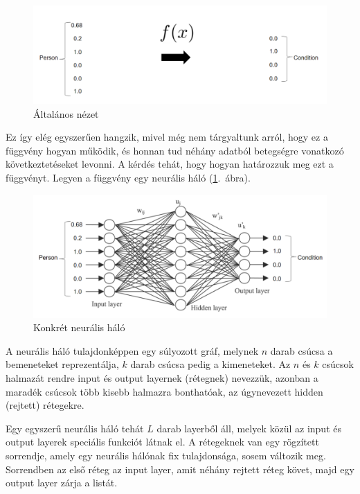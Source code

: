 \begin{figure}[h!]
  
	\begin{center}
	\includegraphics[width=\linewidth]{fgv.png}
	\end{center}
  \caption{Általános nézet}
\end{figure}

Ez így elég egyszerűen hangzik, mivel még nem tárgyaltunk arról, hogy ez a függvény hogyan működik, és honnan tud néhány adatból betegségre vonatkozó következtetéseket levonni. A kérdés tehát, hogy hogyan határozzuk meg ezt a függvényt. Legyen a függvény egy neurális háló (\ref{ab1.2}.~ábra).

\begin{figure}[h!]
 
 \begin{center}
	\includegraphics[width=.9\linewidth]{fgv_network.png}
 \end{center}

  \caption{Konkrét neurális háló}\label{ab1.2}
\end{figure}


A neurális háló tulajdonképpen egy súlyozott gráf, melynek $n$ darab csúcsa a bemeneteket reprezentálja, $k$ darab csúcsa pedig a kimeneteket. Az $n$ és $k$ csúcsok halmazát rendre input és output layernek (rétegnek) nevezzük, azonban a maradék csúcsok több kisebb halmazra bonthatóak, az úgynevezett hidden (rejtett) rétegekre. 

Egy egyszerű neurális háló tehát $L$ darab layerből áll, melyek közül az input és output layerek speciális funkciót látnak el. A rétegeknek van egy rögzített sorrendje, amely egy neurális hálónak fix tulajdonsága, sosem változik meg. Sorrendben az első réteg az input layer, amit néhány rejtett réteg követ, majd egy output layer zárja a listát.

